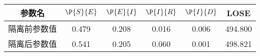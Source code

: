 \begin{tabular}{cccccc}
\hline
参数名&$\P{S}{E}$&$\P{E}{I}$&$\P{I}{R}$&$\P{I}{D}$&LOSE\\
\hline
隔离前参数值&0.479&0.208&0.016&0.006&494.800\\
隔离后参数值&0.541&0.205&0.060&0.001&498.821\\
\hline
\end{tabular}